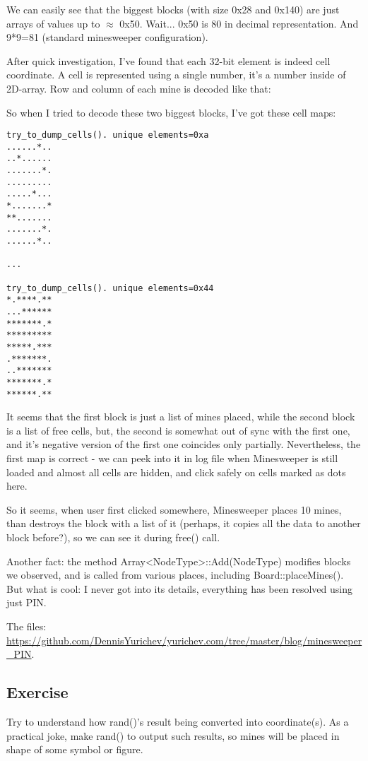We can easily see that the biggest blocks (with size 0x28 and 0x140) are just arrays of values up to $\approx$ 0x50.
Wait... 0x50 is 80 in decimal representation. And 9*9=81 (standard minesweeper configuration).

After quick investigation, I've found that each 32-bit element is indeed cell coordinate.
A cell is represented using a single number, it's a number inside of 2D-array.
Row and column of each mine is decoded like that: 

So when I tried to decode these two biggest blocks, I've got these cell maps:

\begin{lstlisting}
try_to_dump_cells(). unique elements=0xa
......*..
..*......
.......*.
.........
.....*...
*.......*
**.......
.......*.
......*..

...

try_to_dump_cells(). unique elements=0x44
*.****.**
...******
*******.*
*********
*****.***
.*******.
..*******
*******.*
******.**
\end{lstlisting}

It seems that the first block is just a list of mines placed, while the second block is a list of free cells, but, the second is somewhat out of sync with the first one,
and it's negative version of the first one coincides only partially.
Nevertheless, the first map is correct - we can peek into it in log file when Minesweeper is still loaded and almost all cells are hidden, and click safely on cells marked as dots here.

So it seems, when user first clicked somewhere, Minesweeper places 10 mines, than destroys the block with a list of it (perhaps, it copies all the data to another block before?),
so we can see it during free() call.

Another fact: the method Array<NodeType>::Add(NodeType) modifies blocks we observed, and is called from various places, including Board::placeMines().
But what is cool: I never got into its details, everything has been resolved using just PIN.

The files: \url{https://github.com/DennisYurichev/yurichev.com/tree/master/blog/minesweeper_PIN}.

\subsection{Exercise}

Try to understand how rand()'s result being converted into coordinate(s).
As a practical joke, make rand() to output such results, so mines will be placed in shape of some symbol or figure.

